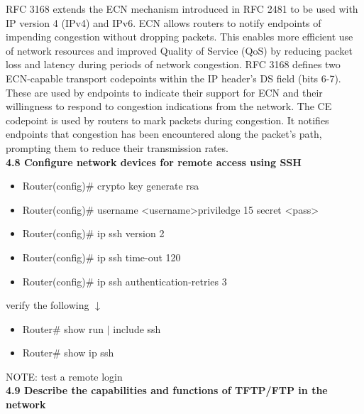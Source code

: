 \documentclass{article}
\begin{document}
	RFC 3168 extends the ECN mechanism introduced in RFC 2481 to be used with IP version 4 (IPv4) and IPv6. ECN allows routers to notify endpoints of impending congestion without dropping packets. This enables more efficient use of network resources and improved Quality of Service (QoS) by reducing packet loss and latency during periods of network congestion. RFC 3168 defines two ECN-capable transport codepoints within the IP header's DS field (bits 6-7). These are used by endpoints to indicate their support for ECN and their willingness to respond to congestion indications from the network. The CE codepoint is used by routers to mark packets during congestion. It notifies endpoints that congestion has been encountered along the packet's path, prompting them to reduce their transmission rates.\\
  
\noindent\textbf{4.8 Configure network devices for remote access using SSH}\\
\begin{itemize}
\item Router(config)\# crypto key generate rsa
\item Router(config)\# username \textless username\textgreater priviledge 15 secret \textless pass\textgreater
\item Router(config)\# ip ssh version 2
\item Router(config)\# ip ssh time-out 120
\item Router(config)\# ip ssh authentication-retries 3
\end{itemize}

verify the following $\downarrow$
\begin{itemize}
\item Router\# show run $\mid$ include ssh
\item Router\# show ip ssh
\end{itemize}
		
NOTE: test a remote login\\
  
\noindent\textbf{4.9 Describe the capabilities and functions of TFTP/FTP in the network}\\
\end{document}
